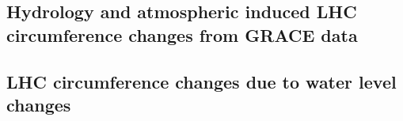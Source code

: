 \documentclass[a4paper,10pt,twoside,openany]{article}
\begin{document}

\subsection{Hydrology and atmospheric induced LHC circumference changes from GRACE data}
\subsection{LHC circumference changes due to water level changes}



%
%
\end{document}
